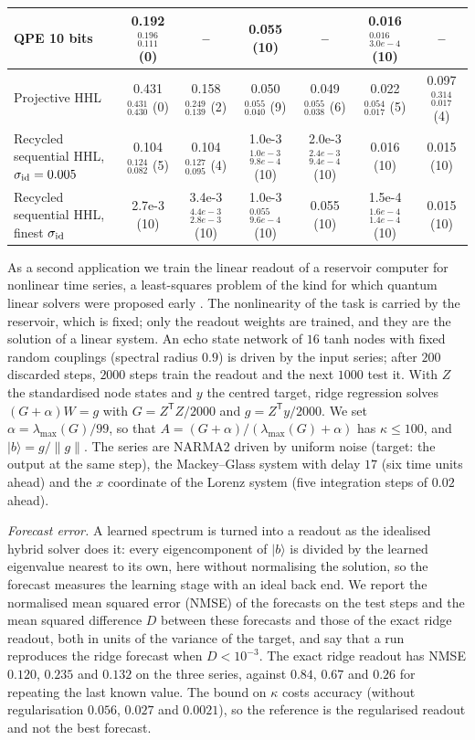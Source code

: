 \documentclass[journal]{IEEEtran}
\newcommand{\lmax}{\lambda_{\max}}
\begin{document}
\begin{table}[t]
\begin{tabular}{lcccccc}
QPE 10 bits & 0.192$_{0.111}^{0.196}$ (0) & -- & 0.055 (10) & -- & 0.016$_{3.0e-4}^{0.016}$ (10) & --\\
\midrule
Projective HHL & 0.431$_{0.430}^{0.431}$ (0) & 0.158$_{0.139}^{0.249}$ (2) & 0.050$_{0.040}^{0.055}$ (9) & 0.049$_{0.038}^{0.055}$ (6) & 0.022$_{0.017}^{0.054}$ (5) & 0.097$_{0.017}^{0.314}$ (4)\\
Recycled sequential HHL, $\sigma_{\rm id}=0.005$ & 0.104$_{0.082}^{0.124}$ (5) & 0.104$_{0.095}^{0.127}$ (4) & 1.0e-3$_{9.8e-4}^{1.0e-3}$ (10) & 2.0e-3$_{9.4e-4}^{2.4e-3}$ (10) & 0.016 (10) & 0.015 (10)\\
Recycled sequential HHL, finest $\sigma_{\rm id}$ & 2.7e-3 (10) & 3.4e-3$_{2.8e-3}^{4.4e-3}$ (10) & 1.0e-3$_{9.6e-4}^{0.055}$ (10) & 0.055 (10) & 1.5e-4$_{1.4e-4}^{1.6e-4}$ (10) & 0.015 (10)\\
\bottomrule
\end{tabular}
\end{table}

As a second application we train the linear readout of a reservoir computer for nonlinear time series, a least-squares problem of the kind for which quantum linear solvers were proposed early \cite{Wiebe2012}. The nonlinearity of the task is carried by the reservoir, which is fixed; only the readout weights are trained, and they are the solution of a linear system. An echo state network \cite{Jaeger2004} of $16$ tanh nodes with fixed random couplings (spectral radius $0.9$) is driven by the input series; after $200$ discarded steps, $2000$ steps train the readout and the next $1000$ test it. With $Z$ the standardised node states and $y$ the centred target, ridge regression solves $(G+\alpha)W=g$ with $G=Z^{\mathsf T}Z/2000$ and $g=Z^{\mathsf T}y/2000$. We set $\alpha=\lmax(G)/99$, so that $A=(G+\alpha)/(\lmax(G)+\alpha)$ has $\kappa\le100$, and $|b\rangle=g/\|g\|$. The series are NARMA2 driven by uniform noise \cite{Atiya2000} (target: the output at the same step), the Mackey--Glass system with delay $17$ \cite{MackeyGlass1977} (six time units ahead) and the $x$ coordinate of the Lorenz system \cite{Lorenz1963} (five integration steps of $0.02$ ahead).

\emph{Forecast error.} A learned spectrum is turned into a readout as the idealised hybrid solver does it: every eigencomponent of $|b\rangle$ is divided by the learned eigenvalue nearest to its own, here without normalising the solution, so the forecast measures the learning stage with an ideal back end. We report the normalised mean squared error (NMSE) of the forecasts on the test steps and the mean squared difference $D$ between these forecasts and those of the exact ridge readout, both in units of the variance of the target, and say that a run reproduces the ridge forecast when $D<10^{-3}$. The exact ridge readout has NMSE $0.120$, $0.235$ and $0.132$ on the three series, against $0.84$, $0.67$ and $0.26$ for repeating the last known value. The bound on $\kappa$ costs accuracy (without regularisation $0.056$, $0.027$ and $0.0021$), so the reference is the regularised readout and not the best forecast.
\end{document}
